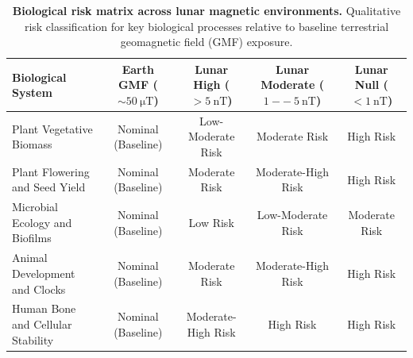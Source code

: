 \begin{table}[t]
\centering
\footnotesize
\caption{\textbf{Biological risk matrix across lunar magnetic environments.} Qualitative risk classification for key biological processes relative to baseline terrestrial geomagnetic field (GMF) exposure.}
\label{tab:risk_matrix}
\begin{tabular}{p{4.0cm}cccc}
\toprule
\textbf{Biological System} & \textbf{Earth GMF ($\sim\SI{50}{\micro\tesla}$)} & \textbf{Lunar High ($>\SI{5}{\nano\tesla}$)} & \textbf{Lunar Moderate ($\SI{1}{--}\SI{5}{\nano\tesla}$)} & \textbf{Lunar Null ($<\SI{1}{\nano\tesla}$)} \\
\midrule
Plant Vegetative Biomass & Nominal (Baseline) & Low-Moderate Risk & Moderate Risk & High Risk \\
Plant Flowering and Seed Yield & Nominal (Baseline) & Moderate Risk & Moderate-High Risk & High Risk \\
Microbial Ecology and Biofilms & Nominal (Baseline) & Low Risk & Low-Moderate Risk & Moderate Risk \\
Animal Development and Clocks & Nominal (Baseline) & Moderate Risk & Moderate-High Risk & High Risk \\
Human Bone and Cellular Stability & Nominal (Baseline) & Moderate-High Risk & High Risk & High Risk \\
\bottomrule
\end{tabular}
\end{table}
